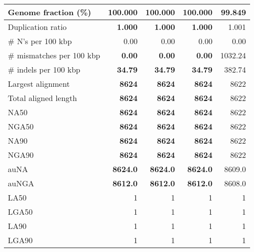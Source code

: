 \documentclass[12pt,a4paper]{article}
\begin{document}
\begin{table}[ht]
\begin{center}
\begin{tabular}{|l*{4}{|r}|}
Genome fraction (\%) & {\bf 100.000} & {\bf 100.000} & {\bf 100.000} & 99.849 \\ \hline
Duplication ratio & {\bf 1.000} & {\bf 1.000} & {\bf 1.000} & 1.001 \\ \hline
\# N's per 100 kbp & 0.00 & 0.00 & 0.00 & 0.00 \\ \hline
\# mismatches per 100 kbp & {\bf 0.00} & {\bf 0.00} & {\bf 0.00} & 1032.24 \\ \hline
\# indels per 100 kbp & {\bf 34.79} & {\bf 34.79} & {\bf 34.79} & 382.74 \\ \hline
Largest alignment & {\bf 8624} & {\bf 8624} & {\bf 8624} & 8622 \\ \hline
Total aligned length & {\bf 8624} & {\bf 8624} & {\bf 8624} & 8622 \\ \hline
NA50 & {\bf 8624} & {\bf 8624} & {\bf 8624} & 8622 \\ \hline
NGA50 & {\bf 8624} & {\bf 8624} & {\bf 8624} & 8622 \\ \hline
NA90 & {\bf 8624} & {\bf 8624} & {\bf 8624} & 8622 \\ \hline
NGA90 & {\bf 8624} & {\bf 8624} & {\bf 8624} & 8622 \\ \hline
auNA & {\bf 8624.0} & {\bf 8624.0} & {\bf 8624.0} & 8609.0 \\ \hline
auNGA & {\bf 8612.0} & {\bf 8612.0} & {\bf 8612.0} & 8608.0 \\ \hline
LA50 & 1 & 1 & 1 & 1 \\ \hline
LGA50 & 1 & 1 & 1 & 1 \\ \hline
LA90 & 1 & 1 & 1 & 1 \\ \hline
LGA90 & 1 & 1 & 1 & 1 \\ \hline
\end{tabular}
\end{center}
\end{table}
\end{document}
